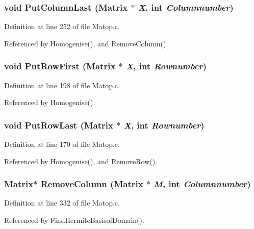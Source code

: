 \subsubsection{\setlength{\rightskip}{0pt plus 5cm}void Put\-Column\-Last (Matrix $\ast$ {\em X}, int {\em Columnnumber})}\label{Matop_8c_a11}




Definition at line 252 of file Matop.c.

Referenced by Homogenise(), and Remove\-Column().

\subsubsection{\setlength{\rightskip}{0pt plus 5cm}void Put\-Row\-First (Matrix $\ast$ {\em X}, int {\em Rownumber})}\label{Matop_8c_a9}




Definition at line 198 of file Matop.c.

Referenced by Homogenise().

\subsubsection{\setlength{\rightskip}{0pt plus 5cm}void Put\-Row\-Last (Matrix $\ast$ {\em X}, int {\em Rownumber})}\label{Matop_8c_a8}




Definition at line 170 of file Matop.c.

Referenced by Homogenise(), and Remove\-Row().

\subsubsection{\setlength{\rightskip}{0pt plus 5cm}Matrix$\ast$ Remove\-Column (Matrix $\ast$ {\em M}, int {\em Columnnumber})}\label{Matop_8c_a15}




Definition at line 332 of file Matop.c.

Referenced by Find\-Hermite\-Basisof\-Domain().

